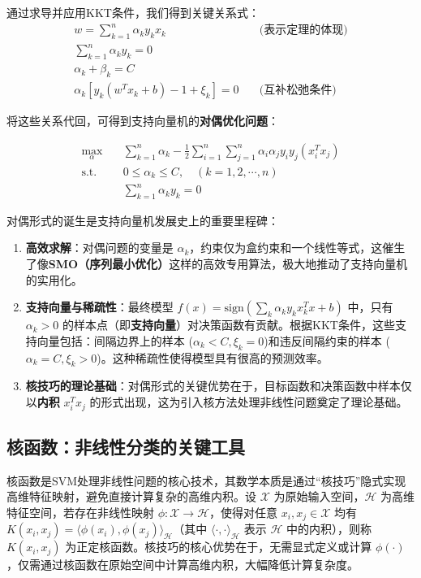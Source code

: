 \documentclass{article}
\newenvironment{solution_cn}{%
  \begin{proof}[解答]%
}{%
  \end{proof}%
}
\begin{document}
\begin{solution_cn}
通过求导并应用KKT条件，我们得到关键关系式：
\begin{align}
w = \sum_{k=1}^{n} \alpha_k y_k x_k  \quad&\text{(表示定理的体现)} \\
\sum_{k=1}^{n} \alpha_k y_k = 0 \\
\alpha_k + \beta_k = C \\
\alpha_k[y_k(w^T x_k + b) - 1 + \xi_k] = 0 \quad &\text{(互补松弛条件)}
\end{align}

将这些关系代回，可得到支持向量机的\textbf{对偶优化问题}：

\begin{equation}
\begin{split}
\max_{\alpha} \quad & \sum_{k=1}^{n} \alpha_k - \frac{1}{2} \sum_{i=1}^{n} \sum_{j=1}^{n} \alpha_i \alpha_j y_i y_j (x_i^T x_j) \\
\text{s.t.} \quad & 0 \leq \alpha_k \leq C, \quad (k = 1,2,\cdots,n) \\
& \sum_{k=1}^{n} \alpha_k y_k = 0
\end{split}
\end{equation}

对偶形式的诞生是支持向量机发展史上的重要里程碑：

\begin{enumerate}
\item \textbf{高效求解}：对偶问题的变量是 $\alpha_k$，约束仅为盒约束和一个线性等式，这催生了像\textbf{SMO（序列最小优化）}这样的高效专用算法，极大地推动了支持向量机的实用化。

\item \textbf{支持向量与稀疏性}：最终模型 $f(x) = \text{sign}(\sum_{k} \alpha_k y_k x_k^T x + b)$ 中，只有 $\alpha_k > 0$ 的样本点（即\textbf{支持向量}）对决策函数有贡献。根据KKT条件，这些支持向量包括：间隔边界上的样本 ($\alpha_k < C, \xi_k = 0$)和违反间隔约束的样本 ($\alpha_k = C, \xi_k > 0$)。这种稀疏性使得模型具有很高的预测效率。

\item \textbf{核技巧的理论基础}：对偶形式的关键优势在于，目标函数和决策函数中样本仅以\textbf{内积} $x_i^T x_j$ 的形式出现，这为引入核方法处理非线性问题奠定了理论基础。
\end{enumerate}

\subsection{核函数：非线性分类的关键工具}

核函数是SVM处理非线性问题的核心技术，其数学本质是通过“核技巧”隐式实现高维特征映射，避免直接计算复杂的高维内积。设 $ \mathcal{X} $ 为原始输入空间，$ \mathcal{H} $ 为高维特征空间，若存在非线性映射 $ \phi: \mathcal{X} \rightarrow \mathcal{H} $，使得对任意 $ x_i, x_j \in \mathcal{X} $ 均有 $ K(x_i, x_j) = \langle \phi(x_i), \phi(x_j) \rangle_{\mathcal{H}} $（其中 $ \langle \cdot, \cdot \rangle_{\mathcal{H}} $ 表示 $ \mathcal{H} $ 中的内积），则称 $ K(x_i, x_j) $ 为正定核函数。核技巧的核心优势在于，无需显式定义或计算 $ \phi(\cdot) $，仅需通过核函数在原始空间中计算高维内积，大幅降低计算复杂度。


\end{solution_cn}
\end{document}
